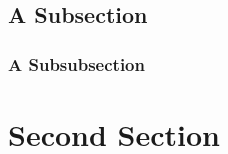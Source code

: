 \documentclass[twoside, english]{sdqtechreport}
\begin{document}
\Blindtext

\subsection{A Subsection}
\label{sec:SecondContent:FirstSubSection}

\Blindtext

\subsubsection{A Subsubsection}

\Blindtext[1]

\section{Second Section}
\label{sec:SecondContent:SecondSection}

\Blindtext


\section{}
\end{document}
